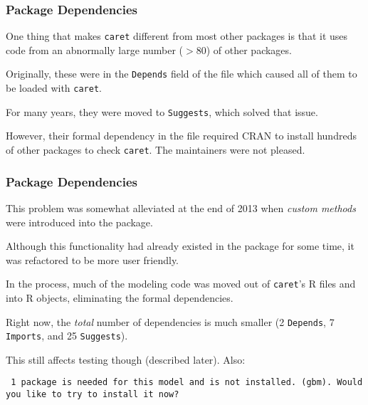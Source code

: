 \documentclass[12 pt]{beamer}\usepackage[]{graphicx}\usepackage[]{color}
\newcommand{\pkg}[1]{{\fontseries{b}\selectfont #1}}
\renewcommand{\pkg}[1]{{\color{darkgreen}\texttt{#1}}}
\begin{document}
  \begin{frame}[fragile]
\frametitle{Package Dependencies}



One thing that makes \pkg{caret} different from most other packages is that it uses code from an abnormally large number ($> 80$) of other packages.

\vspace{.15in}

Originally, these were in the \texttt{Depends} field of the  file which caused all of them to be loaded with \pkg{caret}.

\vspace{.15in}

For many years, they were moved to \texttt{Suggests}, which solved that issue.


\vspace{.15in}

However, their formal dependency in the  file required CRAN  to install hundreds of other packages to check  \pkg{caret}. The maintainers were not pleased.

\end{frame}



\begin{frame}[fragile]
\frametitle{Package Dependencies}

This problem was somewhat alleviated at the end of 2013 when {\em custom methods} were introduced into the package.

\vspace{.1in}

Although this functionality had already existed in the package for some time, it was refactored to be more user friendly.

\vspace{.1in}

In the process, much of the modeling code was moved out of \pkg{caret}'s R files and into R objects, eliminating the formal dependencies.

\vspace{.1in}

Right now, the {\em total} number of dependencies is much smaller (2 \texttt{Depends}, 7 \texttt{Imports}, and 25 \texttt{Suggests}).

\vspace{.1in}

This still affects testing though (described later). Also:

\vspace{.1in}

{\tt \color{darkblue} \footnotesize 1 package is needed for this model and is not installed. (gbm). Would you like to try to install it now?}

\end{frame}
\end{document}
